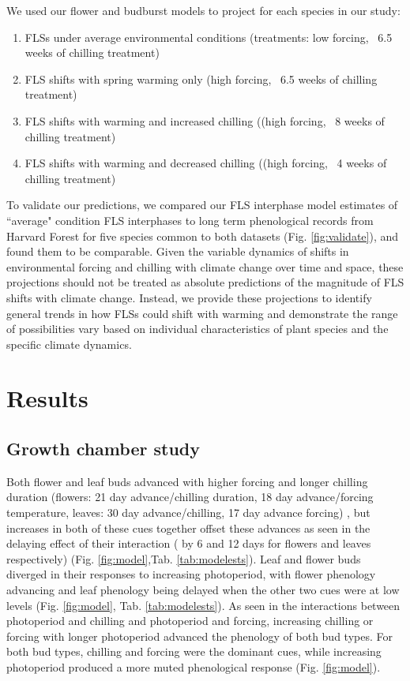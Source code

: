 \documentclass[11pt]{article}
\begin{document}
\noindent We used our flower and budburst models to project for each species in our study:\\
\begin{enumerate}
\item FLSs under average environmental conditions  (treatments: low forcing, ~6.5 weeks of chilling treatment)
\item FLS shifts with spring warming only (high forcing, ~6.5 weeks of chilling treatment)
\item FLS shifts with warming and increased chilling ((high forcing, ~8 weeks of chilling treatment)
\item FLS shifts with warming and decreased chilling ((high forcing, ~4 weeks of chilling treatment)

\end{enumerate}

\noindent To validate our predictions, we compared our FLS interphase model estimates of ``average" condition FLS interphases to long term phenological records from Harvard Forest \citep{OKeefe2015} for five species common to both datasets (Fig. \ref{fig:validate}), and found them to be comparable. Given the variable dynamics of shifts in environmental forcing and chilling with climate change over time and space, these projections should not be treated as absolute predictions of the magnitude of FLS shifts with climate change. Instead, we provide these projections to identify general trends in how FLSs could shift with warming and demonstrate the range of possibilities vary based on individual characteristics of plant species and the specific climate dynamics.\\

\section*{Results}
\subsection*{Growth chamber study}
\noindent  Both flower and leaf buds advanced with higher forcing and longer chilling duration (flowers: 21 day advance/\delta chilling duration, 18 day advance/\delta forcing temperature, leaves: 30 day advance/\delta chilling, 17 day advance \delta forcing) , but increases in both of these cues together offset these advances as seen in the delaying effect of their interaction ( by 6 and 12 days for flowers and leaves respectively) (Fig. \ref{fig:model},Tab. \ref{tab:modelests}). Leaf and flower buds diverged in their responses to increasing photoperiod, with flower phenology advancing and leaf phenology being delayed when the other two cues were at low levels (Fig. \ref{fig:model}, Tab. \ref{tab:modelests}). As seen in the interactions between photoperiod and chilling and photoperiod and forcing, increasing chilling or forcing with longer photoperiod advanced the phenology of both bud types. For both bud types, chilling and forcing were the dominant cues, while increasing photoperiod produced a more muted phenological response (Fig. \ref{fig:model}). \\
\end{document}
